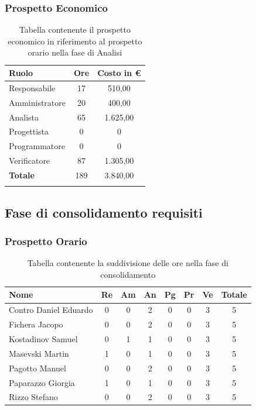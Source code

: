 \documentclass[../piano_di_progetto.tex]{subfiles}
\begin{document}
\newpage

\subsubsection{Prospetto Economico}


\begin{longtable}{|l|c|c|}
	\hline
	\rowcolor{lightgray}
	\textbf{Ruolo} & \textbf{Ore} & \textbf{Costo in €}\\
	\endhead
	\hline
	Responsabile & 17 & 510,00 \\
	Amministratore & 20 & 400,00 \\
	Analista & 65 & 1.625,00 \\
	Progettista & 0 & 0 \\
	Programmatore & 0 & 0 \\
	Verificatore & 87 & 1.305,00 \\
	\hline
	\textbf{Totale} & 189 & 3.840,00 \\
	\hline
	\rowcolor{white}
	\caption{Tabella contenente il prospetto economico in riferimento al prospetto orario nella fase di Analisi} 
\end{longtable}


\subsection{ Fase di consolidamento requisiti}%
\label{sub:fase_cons}
\subsubsection{Prospetto Orario}

\begin{table}[!ht]

	\centering
	\begin{tabular}{|l|c|c|c|c|c|c|c|}
	\hline
	\rowcolor{lightgray}
	\textbf{Nome} & \textbf{Re} & \textbf{Am} & \textbf{An} & \textbf{Pg}  & \textbf{Pr}   & \textbf{Ve} & \textbf{Totale} \\
	\hline
		Contro Daniel Eduardo & 0 & 0 & 2 & 0 & 0 & 3  & 5 \\
		Fichera Jacopo & 0 & 0 & 2 & 0 & 0 & 3 & 5 \\
		Kostadinov Samuel & 0 & 1 & 1 & 0 & 0 & 3 & 5 \\			
		Masevski Martin & 1 & 0 & 1 & 0 & 0 & 3 & 5 \\
		Pagotto Manuel & 0 & 0 & 2 & 0 & 0 & 3 & 5 \\			
		Paparazzo Giorgia & 1 & 0 & 1 & 0 & 0 & 3 & 5 \\
		Rizzo Stefano & 0 & 0 & 2 & 0 & 0 & 3 & 5 \\
	\hline	
	\end{tabular}
	\caption{Tabella contenente la suddivisione delle ore nella fase di consolidamento}
\end{table}
\end{document}
